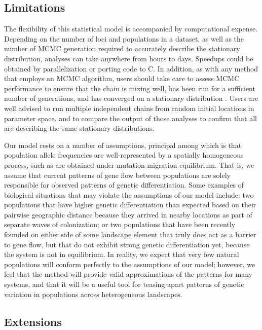\subsection*{Limitations}
The flexibility of this statistical model is accompanied by computational expense.  Depending on the number of loci and populations in a dataset, as well as the number of MCMC generation required to accurately describe the stationary distribution, analyses can take anywhere from hours to days.  Speedups could be obtained by parallelization or porting code to C.  In addition, as with any method that employs an MCMC algorithm, users should take care to assess MCMC performance to ensure that the chain is mixing well, has been run for a sufficient number of generations, and has converged on a stationary distribution \citep{Gilks1996}.  Users are well advised to run multiple independent chains from random initial locations in parameter space, and to compare the output of those analyses to confirm that all are describing the same stationary distributions. 

Our model rests on a number of assumptions, principal among which is that population allele frequencies are well-represented by a spatially homogeneous process, such as are obtained under mutation-migration equilibrium.  That is, we assume that current patterns of gene flow between populations are solely responsible for observed patterns of genetic differentiation.  
Some examples of biological situations that may violate the assumptions of our model include: two populations that have higher genetic differentiation than expected based on their pairwise geographic distance because they arrived in nearby locations as part of separate waves of colonization;  or two populations that have been recently founded on either side of some landscape element that truly does act as a barrier to gene flow, but that do not exhibit strong genetic differentiation yet, because the system is not in equilibrium.  In reality, we expect that very few natural populations will conform perfectly to the assumptions of our model; however, we feel that the method will provide valid approximations of the patterns for many systems, and that it will be a useful tool for teasing apart patterns of genetic variation in populations across heterogeneous landscapes.

\subsection*{Extensions}

